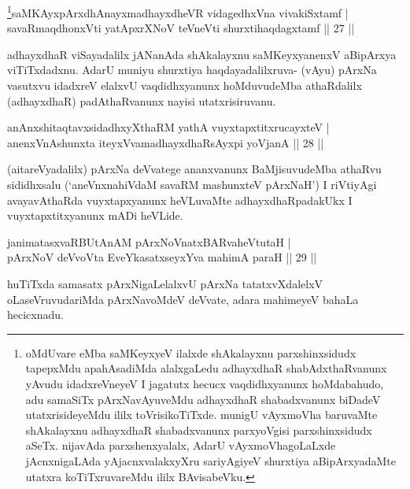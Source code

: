 \begin{shl}
\footnote{oMdUvare eMba saMKeyxyeV ilalxde shAkalayxnu parxshinxsidudx tapepxMdu apahAsadiMda alalxgaLedu adhayxdhaR shabAdxthaRvanunx yAvudu idadxreVneyeV I jagatutx hecucx vaqdidhxyanunx hoMdabahudo, adu samaSiTx pArxNavAyuveMdu adhayxdhaR shabadxvanunx biDadeV utatxrisideyeMdu ililx toVrisikoTiTxde. munigU vAyxmoVha baruvaMte shAkalayxnu adhayxdhaR shabadxvanunx parxyoVgisi  parxshinxsidudx aSeTx. nijavAda parxshenxyalalx, AdarU vAyxmoVhagoLaLxde jAcnxnigaLAda yAjacnxvalakxyXru sariyAgiyeV shurxtiya aBipArxyadaMte utatxra koTiTxruvareMdu ililx BAvisabeVku.}saMKAyxpArxdhAnayxmadhayxdheVR vidagedhxVna vivakiSxtamf |\\
savaRmaqdhonxVti yatApxrXNoV teVneVti shurxtihaqdagxtamf \hfill || 27 ||
\end{shl}

\begin{artha}
adhayxdhaR viSayadalilx jANanAda shAkalayxnu saMKeyxyanenxV aBipArxya viTiTxdadxnu. AdarU muniyu shurxtiya haqdayadalilxruva- (vAyu) pArxNa vasutxvu idadxreV elalxvU vaqdidhxyanunx hoMduvudeMba athaRdalilx (adhayxdhaR) padAthaRvanunx nayisi utatxrisiruvanu.
\end{artha}


\begin{shl}
anAnxshitaqtavxsidadhxyXthaRM yathA vuyxtapxtitxrucayxteV |\\
anenxVnAshunxta iteyxVvamadhayxdhaRsAyxpi yoVjanA \hfill || 28 ||
\end{shl}

\begin{artha}
(aitareVyadalilx) pArxNa deVvatege ananxvanunx BaMjisuvudeMba athaRvu sididhxsalu (`aneVnxnahiVdaM savaRM mashunxteV pArxNaH') I riVtiyAgi avayavAthaRda vuyxtapxyanunx heVLuvaMte adhayxdhaRpadakUkx I vuyxtapxtitxyanunx mADi heVLide.
\end{artha}


\begin{shl}
janimatasxvaRBUtAnAM pArxNoV\s natxBARvaheVtutaH |\\
pArxNoV deVvoV\s ta EveYkasatxseyxYva mahimA paraH \hfill || 29 ||
\end{shl}

\begin{artha}
huTiTxda samasatx pArxNigaLelalxvU pArxNa tatatxvXdalelxV oLaseVruvudariMda pArxNavoMdeV deVvate, adara mahimeyeV bahaLa hecicxnadu.
\end{artha}

